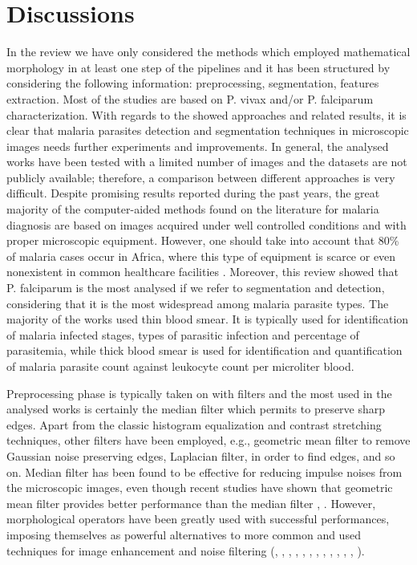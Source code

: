 \documentclass[sensors,review,submit,moreauthors,pdftex,10pt,a4paper]{mdpi}
\begin{document}
	
	\section{Discussions}
	In the review we have only considered the methods which employed mathematical morphology in at least one step of the pipelines and it has been structured by considering the following information: preprocessing, segmentation, features extraction.
	Most of the studies are based on P. vivax and/or P. falciparum characterization.
	With regards to the showed approaches and related results, it is clear that malaria parasites detection and segmentation techniques in microscopic images needs further experiments and improvements. In general, the analysed works have been tested with a limited number of images and the datasets are not publicly available; therefore, a comparison between different approaches is very difficult. Despite promising results reported during the past years, the great majority of the computer-aided methods found on the literature for malaria diagnosis are based on images acquired under well controlled conditions and with proper microscopic equipment. However, one should take into account that 80\% of malaria cases occur in Africa, where this type of equipment is scarce or even nonexistent in common healthcare facilities \cite{Rosado2017}.
	Moreover, this review showed that P. falciparum is the most analysed if we refer to segmentation and detection, considering that it is the most widespread among malaria parasite types.
	The majority of the works used thin blood smear. It is typically used for identification of malaria infected stages, types of parasitic infection and percentage of parasitemia, while thick blood smear is used for identification and quantification of malaria parasite count against leukocyte count per microliter blood.
	
	Preprocessing phase is typically taken on with filters and the most used in the analysed works is certainly the median filter which permits to preserve sharp edges. Apart from the classic histogram equalization and contrast stretching techniques, other filters have been employed, e.g., geometric mean filter to remove Gaussian noise preserving edges, Laplacian filter, in order to find edges, and so on.
	Median filter has been found to be effective for reducing impulse noises from the microscopic images, even though recent studies have shown that geometric mean filter provides better performance than the median filter \cite{Das2013}, \cite{Das2015}. However, morphological operators have been greatly used with successful performances, imposing themselves as powerful alternatives to more common and used techniques for image enhancement and noise filtering (\cite{DiRuberto2002}, \cite{Gonzalez2016}, \cite{Kareem2011}, \cite{Kareem2012}, \cite{Malihi2013}, \cite{Mushabe2013}, \cite{Oliveira2017}, \cite{Reni2015}, \cite{Romero2016}, \cite{Ross2006} \cite{Sheik2013}, \cite{Somasekar2015}, \cite{Springl2009}, \cite{Tek2010}).
	
\end{document}
